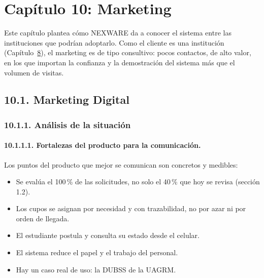 
\newpage
\section{Capítulo 10: Marketing}\label{cap:marketing}


Este capítulo plantea cómo NEXWARE da a conocer el sistema entre las instituciones que podrían adoptarlo. Como el cliente es una institución (Capítulo~\hyperref[cap:mercado]{8}), el marketing es de tipo consultivo: pocos contactos, de alto valor, en los que importan la confianza y la demostración del sistema más que el volumen de visitas.

\subsection{10.1. Marketing Digital}

\subsubsection{10.1.1. Análisis de la situación}

\paragraph{10.1.1.1. Fortalezas del producto para la comunicación.}

Los puntos del producto que mejor se comunican son concretos y medibles:

\begin{itemize}
    \item Se evalúa el 100\,\% de las solicitudes, no solo el 40\,\% que hoy se revisa (sección 1.2).
    \item Los cupos se asignan por necesidad y con trazabilidad, no por azar ni por orden de llegada.
    \item El estudiante postula y consulta su estado desde el celular.
    \item El sistema reduce el papel y el trabajo del personal.
    \item Hay un caso real de uso: la DUBSS de la UAGRM.
\end{itemize}

